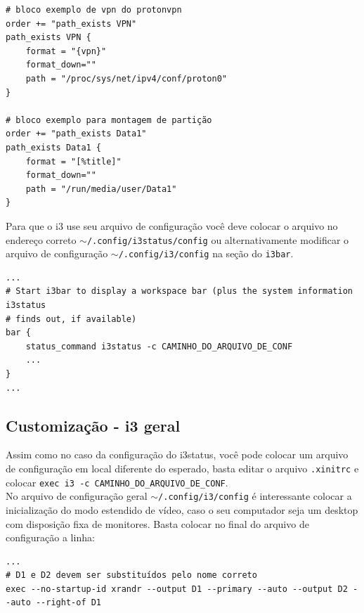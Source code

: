 \documentclass[12pt,a4paper]{article}
\begin{document}
\begin{lstlisting}
# bloco exemplo de vpn do protonvpn
order += "path_exists VPN"
path_exists VPN {
    format = "{vpn}"
    format_down=""
    path = "/proc/sys/net/ipv4/conf/proton0"
}

# bloco exemplo para montagem de partição 
order += "path_exists Data1"
path_exists Data1 {
    format = "[%title]"
    format_down=""
    path = "/run/media/user/Data1"
}
\end{lstlisting}

\vspace{\baselineskip}

Para que o i3 use seu arquivo de configuração você deve colocar o arquivo no endereço correto \texttt{$\sim$/.config/i3status/config} ou alternativamente modificar o arquivo de configuração \texttt{$\sim$/.config/i3/config} na seção do \texttt{i3bar}. \\

\begin{lstlisting}
...
# Start i3bar to display a workspace bar (plus the system information i3status
# finds out, if available)
bar {
    status_command i3status -c CAMINHO_DO_ARQUIVO_DE_CONF
    ...
}
...
\end{lstlisting}

\subsection{Customização - i3 geral}

\hspace{\baselineskip}

Assim como no caso da configuração do i3status, você pode colocar um arquivo de configuração em local diferente do esperado, basta editar o arquivo \texttt{.xinitrc} e colocar \texttt{exec i3 -c CAMINHO\_DO\_ARQUIVO\_DE\_CONF}.\\

No arquivo de configuração geral \texttt{$\sim$/.config/i3/config} é interessante colocar a inicialização do modo estendido de vídeo, caso o seu computador seja um desktop com disposição fixa de monitores. Basta colocar no final do arquivo de configuração a linha:\\

\begin{lstlisting}
...
# D1 e D2 devem ser substituídos pelo nome correto 
exec --no-startup-id xrandr --output D1 --primary --auto --output D2 --auto --right-of D1 
\end{lstlisting}
\end{document}

